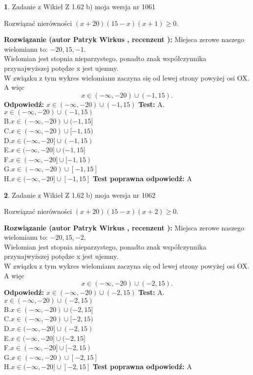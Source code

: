 \documentclass[12pt, a4paper]{article}
\theoremstyle{definition} %
\newtheorem{zad}{}
\newcommand{\zadStart}[1]{\begin{zad}#1\newline}
\newcommand{\zadStop}{\end{zad}}
\newcommand{\rozwStart}[2]{\noindent \textbf{Rozwiązanie (autor #1 , recenzent #2): }\newline}
\newcommand{\rozwStop}{\newline}
\newcommand{\odpStart}{\noindent \textbf{Odpowiedź:}\newline}
\newcommand{\odpStop}{\newline}
\newcommand{\testStart}{\noindent \textbf{Test:}\newline}
\newcommand{\testStop}{\newline}
\newcommand{\kluczStart}{\noindent \textbf{Test poprawna odpowiedź:}\newline}
\newcommand{\kluczStop}{\newline}
\begin{document}
\zadStart{Zadanie z Wikieł Z 1.62 b) moja wersja nr 1061}

Rozwiązać nierówności $(x+20)(15-x)(x+1)\ge0$.
\zadStop
\rozwStart{Patryk Wirkus}{}
Miejsca zerowe naszego wielomianu to: $-20, 15, -1$.\\
Wielomian jest stopnia nieparzystego, ponadto znak współczynnika przy\linebreak najwyższej potędze x jest ujemny.\\ W związku z tym wykres wielomianu zaczyna się od lewej strony powyżej osi OX. A więc $$x \in (-\infty,-20) \cup (-1,15).$$
\rozwStop
\odpStart
$x \in (-\infty,-20) \cup (-1,15)$
\odpStop
\testStart
A.$x \in (-\infty,-20) \cup (-1,15)$\\
B.$x \in (-\infty,-20) \cup (-1,15]$\\
C.$x \in (-\infty,-20) \cup [-1,15)$\\
D.$x \in (-\infty,-20] \cup (-1,15)$\\
E.$x \in (-\infty,-20] \cup (-1,15]$\\
F.$x \in (-\infty,-20] \cup [-1,15)$\\
G.$x \in (-\infty,-20) \cup [-1,15]$\\
H.$x \in (-\infty,-20] \cup [-1,15]$
\testStop
\kluczStart
A
\kluczStop



\zadStart{Zadanie z Wikieł Z 1.62 b) moja wersja nr 1062}

Rozwiązać nierówności $(x+20)(15-x)(x+2)\ge0$.
\zadStop
\rozwStart{Patryk Wirkus}{}
Miejsca zerowe naszego wielomianu to: $-20, 15, -2$.\\
Wielomian jest stopnia nieparzystego, ponadto znak współczynnika przy\linebreak najwyższej potędze x jest ujemny.\\ W związku z tym wykres wielomianu zaczyna się od lewej strony powyżej osi OX. A więc $$x \in (-\infty,-20) \cup (-2,15).$$
\rozwStop
\odpStart
$x \in (-\infty,-20) \cup (-2,15)$
\odpStop
\testStart
A.$x \in (-\infty,-20) \cup (-2,15)$\\
B.$x \in (-\infty,-20) \cup (-2,15]$\\
C.$x \in (-\infty,-20) \cup [-2,15)$\\
D.$x \in (-\infty,-20] \cup (-2,15)$\\
E.$x \in (-\infty,-20] \cup (-2,15]$\\
F.$x \in (-\infty,-20] \cup [-2,15)$\\
G.$x \in (-\infty,-20) \cup [-2,15]$\\
H.$x \in (-\infty,-20] \cup [-2,15]$
\testStop
\kluczStart
A
\kluczStop
\end{document}
